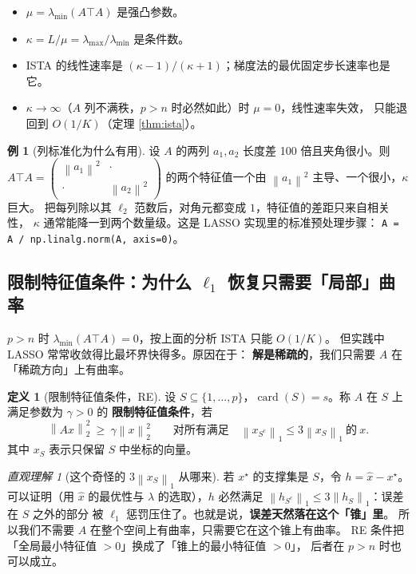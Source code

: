 \documentclass[11pt,a4paper,UTF8]{ctexart}
\theoremstyle{plain}
\theoremstyle{definition}
\newtheorem{definition}[theorem]{定义}
\newtheorem{example}[theorem]{例}
\theoremstyle{remark}
\newtheorem{intuition}[theorem]{直观理解}
\newcommand{\norm}[1]{\left\lVert #1 \right\rVert}
\DeclareMathOperator{\card}{card}
\begin{document}
\begin{itemize}
\item $\mu=\lambda_{\min}(A\top A)$ 是强凸参数。
\item $\kappa=L/\mu=\lambda_{\max}/\lambda_{\min}$ 是条件数。
\item ISTA 的线性速率是 $(\kappa-1)/(\kappa+1)$；梯度法的最优固定步长速率也是它。
\item $\kappa\to\infty$（$A$ 列不满秩，$p>n$ 时必然如此）时 $\mu=0$，线性速率失效，
      只能退回到 $O(1/K)$（定理 \ref{thm:ista}）。
\end{itemize}

\begin{example}[列标准化为什么有用]
设 $A$ 的两列 $a_1,a_2$ 长度差 100 倍且夹角很小。则 $A\top A=\begin{pmatrix}\norm{a_1}^2&\cdot\\\cdot&\norm{a_2}^2\end{pmatrix}$
的两个特征值一个由 $\norm{a_1}^2$ 主导、一个很小，$\kappa$ 巨大。
把每列除以其 $\ell_2$ 范数后，对角元都变成 $1$，特征值的差距只来自相关性，
$\kappa$ 通常能降一到两个数量级。这是 LASSO 实现里的标准预处理步骤：
\texttt{A = A / np.linalg.norm(A, axis=0)}。
\end{example}

\subsection{限制特征值条件：为什么 $\ell_1$ 恢复只需要「局部」曲率}

$p>n$ 时 $\lambda_{\min}(A\top A)=0$，按上面的分析 ISTA 只能 $O(1/K)$。
但实践中 LASSO 常常收敛得比最坏界快得多。原因在于：
\textbf{解是稀疏的}，我们只需要 $A$ 在「稀疏方向」上有曲率。

\begin{definition}[限制特征值条件，RE]
设 $S\subseteq\{1,\dots,p\}$，$\card(S)=s$。称 $A$ 在 $S$ 上满足参数为 $\gamma>0$ 的
\textbf{限制特征值条件}，若
\[
\norm{Ax}_2^2\ \ge\ \gamma\norm{x}_2^2
\qquad\text{对所有满足}\quad \norm{x_{S^c}}_1\le 3\norm{x_S}_1\ \text{的}\ x .
\]
其中 $x_S$ 表示只保留 $S$ 中坐标的向量。
\end{definition}

\begin{intuition}[这个奇怪的 $3\norm{x_S}_1$ 从哪来]
若 $x^\star$ 的支撑集是 $S$，令 $h=\hat x-x^\star$。可以证明（用 $\hat x$ 的最优性与
$\lambda$ 的选取），$h$ 必然满足 $\norm{h_{S^c}}_1\le3\norm{h_S}_1$：误差在 $S$ 之外的部分
被 $\ell_1$ 惩罚压住了。也就是说，\textbf{误差天然落在这个「锥」里}。
所以我们不需要 $A$ 在整个空间上有曲率，只需要它在这个锥上有曲率。
RE 条件把「全局最小特征值 $>0$」换成了「锥上的最小特征值 $>0$」，
后者在 $p>n$ 时也可以成立。
\end{intuition}
\end{document}

